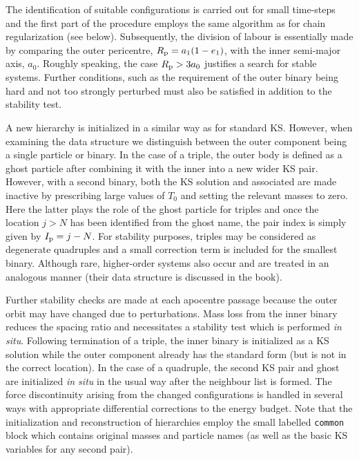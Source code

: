 \documentclass[12pt]{article}
\begin{document}
The identification of suitable configurations is carried out for small \cm
time-steps and the first part of the procedure employs the same algorithm
as for chain regularization (see below).
Subsequently, the division of labour is essentially made by comparing the
outer pericentre, $R_{\rm p} = a_1 (1 - e_1)$, with the inner semi-major
axis, $a_0$.
Roughly speaking, the case $R_{\rm p} > 3 a_0$ justifies a search for stable
systems.
Further conditions, such as the requirement of the outer binary being hard
and not too strongly perturbed must also be satisfied in addition to the
stability test.

A new hierarchy is initialized in a similar way as for standard KS.
However, when examining the data structure we distinguish between the outer
component being a single particle or binary.
In the case of a triple, the outer body is defined as a ghost particle after
combining it with the inner \cm into a new wider KS pair.
However, with a second binary, both the KS solution and associated \cm are
made inactive by prescribing large values of $T_0$ and setting the relevant
masses to zero.
Here the latter plays the role of the ghost particle for triples and once
the \cm location $j > N$ has been identified from the ghost name, the pair
index is simply given by $I_{\rm p} = j - N$.
For stability purposes, triples may be considered as degenerate quadruples
and a small correction term is included for the smallest binary.
Although rare, higher-order systems also occur and are treated in an
analogous manner (their data structure is discussed in the book). 

Further stability checks are made at each apocentre passage because the outer
orbit may have changed due to perturbations.
Mass loss from the inner binary reduces the spacing ratio and necessitates a
stability test which is performed {\it in situ}.
Following termination of a triple, the inner binary is initialized as a KS
solution while the outer component already has the standard form (but is not
in the correct location).
In the case of a quadruple, the second KS pair and ghost \cm are initialized
{\it in situ} in the usual way after the neighbour list is formed.
The force discontinuity arising from the changed configurations is handled in
several ways with appropriate differential corrections to the energy budget.
Note that the initialization and reconstruction of hierarchies employ the
small labelled {\tt common} block {} which contains original
masses and particle names (as well as the basic KS variables for any second
pair).
\end{document}
